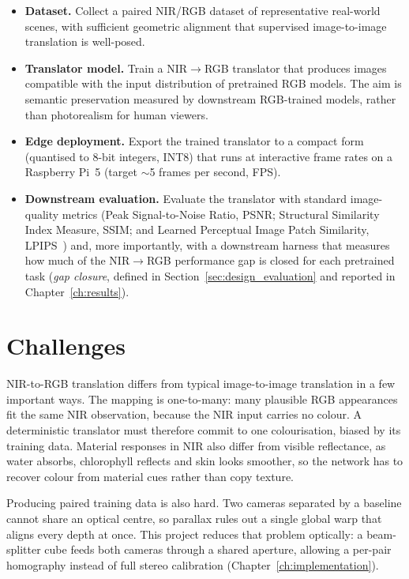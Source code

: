 \begin{itemize}
    \item \textbf{Dataset.} Collect a paired NIR/RGB dataset of representative real-world scenes, with sufficient geometric alignment that supervised image-to-image translation is well-posed.
    \item \textbf{Translator model.} Train a NIR$\rightarrow$RGB translator that produces images compatible with the input distribution of pretrained RGB models. The aim is semantic preservation measured by downstream RGB-trained models, rather than photorealism for human viewers.
    \item \textbf{Edge deployment.} Export the trained translator to a compact form (quantised to 8-bit integers, INT8) that runs at interactive frame rates on a Raspberry Pi~5 (target $\sim$5 frames per second, FPS).
    \item \textbf{Downstream evaluation.} Evaluate the translator with standard image-quality metrics (Peak Signal-to-Noise Ratio, PSNR; Structural Similarity Index Measure, SSIM; and Learned Perceptual Image Patch Similarity, LPIPS~\cite{zhang2018lpips}) and, more importantly, with a downstream harness that measures how much of the NIR$\rightarrow$RGB performance gap is closed for each pretrained task (\textit{gap closure}, defined in Section~\ref{sec:design_evaluation} and reported in Chapter~\ref{ch:results}).
\end{itemize}

\section{Challenges}
\label{sec:intro_challenges}

NIR-to-RGB translation differs from typical image-to-image translation in a few important ways. The mapping is one-to-many: many plausible RGB appearances fit the same NIR observation, because the NIR input carries no colour. A deterministic translator must therefore commit to one colourisation, biased by its training data. Material responses in NIR also differ from visible reflectance, as water absorbs, chlorophyll reflects and skin looks smoother, so the network has to recover colour from material cues rather than copy texture.

Producing paired training data is also hard. Two cameras separated by a baseline cannot share an optical centre, so parallax rules out a single global warp that aligns every depth at once. This project reduces that problem optically: a beam-splitter cube feeds both cameras through a shared aperture, allowing a per-pair homography instead of full stereo calibration (Chapter~\ref{ch:implementation}). 

